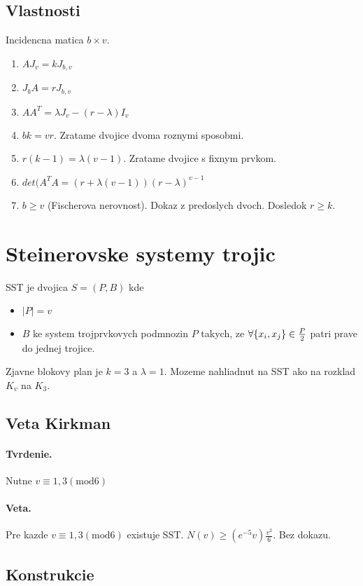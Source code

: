 \documentclass[10pt,a4paper]{article}
\begin{document}
\subsection{Vlastnosti}
Incidencna matica $b \times v$.
\begin{enumerate}
\item $AJ_v = kJ_{b,v}$
\item $J_bA = rJ_{b,v}$
\item $AA^T = \lambda J_v - (r-\lambda)I_v$
\item $bk = vr$. Zratame dvojice dvoma roznymi sposobmi. 
\item $r(k-1)=\lambda (v-1)$. Zratame dvojice s fixnym prvkom. 
\item $det(A^TA = (r + \lambda (v-1))(r-\lambda)^{v-1}$
\item $b \geq v$ (Fischerova nerovnost). Dokaz z predoslych dvoch. Dosledok $r \geq k$.  
\end{enumerate}

\section{Steinerovske systemy trojic}
SST je dvojica $S = (P,B)$ kde 
\begin{itemize}
\item $|P|=v$
\item $B$ ke system trojprvkovych podmnozin $P$ takych, ze $\forall \{x_i, x_j\} \in {P \over 2}$ patri prave do jednej trojice. 
\end{itemize}
Zjavne blokovy plan je $k=3$ a $\lambda=1$. Mozeme nahliadnut na SST ako na rozklad $K_v$ na $K_3$. 

\subsection{Veta Kirkman}
\paragraph{Tvrdenie.} 
Nutne $v \equiv 1,3 (\textrm{mod} 6)$
\paragraph{Veta.} 
Pre kazde $v \equiv 1,3 (\textrm{mod} 6)$ existuje SST. $N(v) \geq (e^{-5}v)\frac{v^2}{6}$.
Bez dokazu.

\subsection{Konstrukcie}
\end{document}
